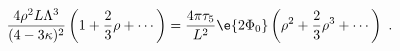 \begin{equation}
\label{pot_exp}
  \frac{4\rho^2 L \Lambda^3}{(4-3\kappa)^2} \left( 1 +\frac23 \rho
  +\cdots\right) =
  \frac{4\pi\tau_5}{L^2} \e{2\Phi_0} 
  \left( \rho^2 + \frac23 \rho^3 +\cdots \right)~.
\end{equation}

